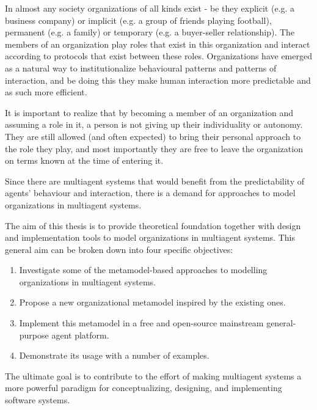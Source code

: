 In almost any society organizations of all kinds exist - be they explicit (e.g. a business company) or implicit (e.g. a group of friends playing football), permanent (e.g. a family) or temporary (e.g. a buyer-seller relationship).
The members of an organization play roles that exist in this organization and interact according to protocols that exist between these roles.
Organizations have emerged as a natural way to institutionalize behavioural patterns and patterns of interaction, and be doing this they make human interaction more predictable and as such more efficient.

It is important to realize that by becoming a member of an organization and assuming a role in it, a person is not giving up their individuality or autonomy.
They are still allowed (and often expected) to bring their personal approach to the role they play, and most importantly they are free to leave the organization on terms known at the time of entering it.

Since there are multiagent systems that would benefit from the predictability of agents' behaviour and interaction, there is a demand for approaches to model organizations in multiagent systems.


The aim of this thesis is to provide theoretical foundation together with design and implementation tools to model organizations in multiagent systems.
This general aim can be broken down into four specific objectives:
\begin{enumerate}
	\item Investigate some of the metamodel-based approaches to modelling organizations in multiagent systems.
	\item Propose a new organizational metamodel inspired by the existing ones.
	\item Implement this metamodel in a free and open-source mainstream general-purpose agent platform.
	\item Demonstrate its usage with a number of examples. 
\end{enumerate}
The ultimate goal is to contribute to the effort of making multiagent systems a more powerful paradigm for conceptualizing, designing, and implementing software systems.



